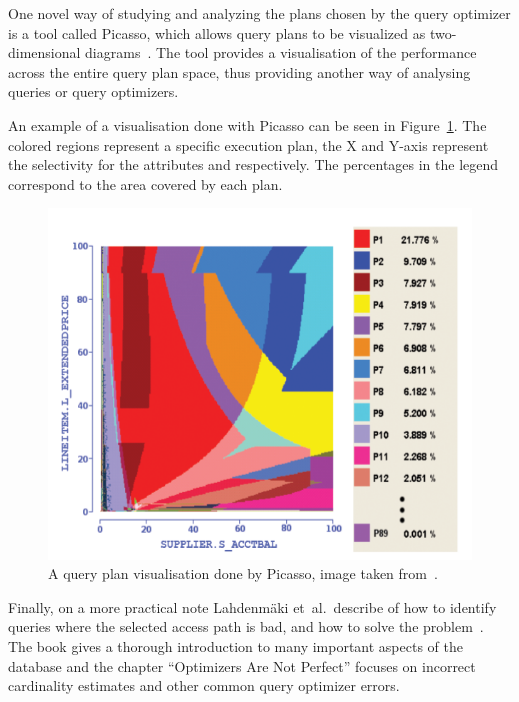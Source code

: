 One novel way of studying and analyzing the plans chosen by the query optimizer
is a tool called Picasso, which allows query plans to be visualized as
two-dimensional diagrams~\cite{haritsa_2010_picasso_tpdqov}. The tool provides a
visualisation of the performance across the entire query plan space, thus
providing another way of analysing queries or query optimizers.

An example of a visualisation done with Picasso can be seen in
Figure~\ref{fig:picasso}. The colored regions represent a specific execution
plan, the X and Y-axis represent the selectivity for the attributes
 and  respectively. The
percentages in the legend correspond to the area covered by each plan.

\begin{figure}[ht]
  \includegraphics[scale=0.6]{Images/Picasso.png}
  \caption[A query plan visualisation done by Picasso]{A query plan
    visualisation done by Picasso, image taken
    from~\cite{haritsa_2010_picasso_tpdqov}.}\label{fig:picasso}
\end{figure}

Finally, on a more practical note Lahdenmäki  et\ al.\ describe of how to
identify queries where the selected access path is bad, and how to solve the
problem~\cite{lahdenmaki_2005_relational_rdidatodossea}. The book gives a
thorough introduction to many important aspects of the database and the chapter
``Optimizers Are Not Perfect'' focuses on incorrect cardinality estimates and
other common query optimizer errors.

